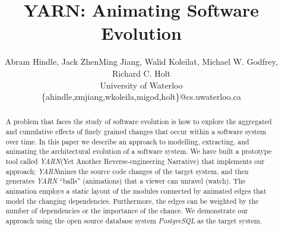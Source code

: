 \documentclass[times, 10pt,twocolumn]{article}
\newcommand{\yarn}{\emph{YARN\xspace}}
\newcommand{\YARN}{\yarn}
\newcommand{\postgresql}{\emph{PostgreSQL}\xspace}
\begin{document}
\newcommand{\names}{Abram Hindle, Jack ZhenMing Jiang, Walid Koleilat,
  Michael W. Godfrey, Richard C. Holt}
\author{
\names \\
University of Waterloo\\
\{ahindle,zmjiang,wkoleila,migod,holt\}@cs.uwaterloo.ca
}
\title{
YARN: Animating Software Evolution
}

\maketitle
\thispagestyle{empty}

\begin{abstract}

A problem that faces the study of software evolution is how to explore the
aggregated and cumulative effects of finely grained changes that occur
within a software system over time.  In this paper we describe an approach
to modelling, extracting, and animating the architectural evolution of a
software system.  We have built a prototype tool called \YARN (Yet Another
Reverse-engineering Narrative) that implements our approach;  \YARN mines
the source code changes of the target system, and then generates \YARN
``balls'' (animations) that a viewer can unravel (watch).  The animation
employs a static layout of the modules connected by animated edges that
model the changing dependencies.  Furthermore, the edges can be weighted by
the number of dependencies or the importance of the chance.  We demonstrate
our approach using the open source database system \postgresql as the target
system.


\end{abstract}




\end{document}
